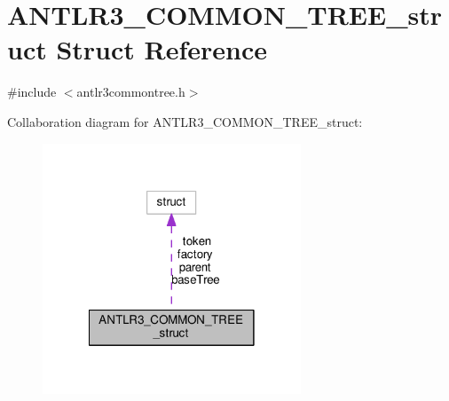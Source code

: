 \hypertarget{struct_a_n_t_l_r3___c_o_m_m_o_n___t_r_e_e__struct}{\section{A\-N\-T\-L\-R3\-\_\-\-C\-O\-M\-M\-O\-N\-\_\-\-T\-R\-E\-E\-\_\-struct Struct Reference}
\label{struct_a_n_t_l_r3___c_o_m_m_o_n___t_r_e_e__struct}
}


{\ttfamily \#include $<$antlr3commontree.\-h$>$}



Collaboration diagram for A\-N\-T\-L\-R3\-\_\-\-C\-O\-M\-M\-O\-N\-\_\-\-T\-R\-E\-E\-\_\-struct\-:
\nopagebreak
\begin{figure}[H]
\begin{center}
\leavevmode
\includegraphics[width=218pt]{struct_a_n_t_l_r3___c_o_m_m_o_n___t_r_e_e__struct__coll__graph}
\end{center}
\end{figure}

